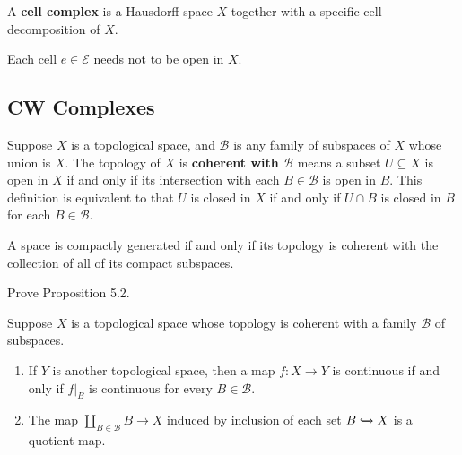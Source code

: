 A \textbf{cell complex} is a Hausdorff space \( X \) together with a specific cell decomposition of \( X \).

Each cell \( e \in \mathscr{E} \) needs not to be open in \( X \).

\subsection{CW Complexes}

Suppose \( X \) is a topological space, and \( \mathscr{B} \) is any family of subspaces of \( X \) whose union is \( X \). The topology of \( X \) is \textbf{coherent with \( \mathscr{B} \)} means a subset \( U \subseteq X \) is open in \( X \) if and only if its intersection with each \( B\in\mathscr{B} \) is open in \( B \). This definition is equivalent to that \( U \) is closed in \( X \) if and only if \( U\cap B \) is closed in \( B \) for each \( B \in \mathscr{B} \).

A space is compactly generated if and only if its topology is coherent with the collection of all of its compact subspaces.

\begin{exercise}{5.3}\label{exercise:5.3}
	Prove Proposition 5.2.

	Suppose \( X \) is a topological space whose topology is coherent with a family \( \mathscr{B} \) of subspaces.
	\begin{enumerate}[label={(\alph*)}]
		\item If \( Y \) is another topological space, then a map \( f: X\to Y \) is continuous if and only if \( f\vert_{B} \) is continuous for every \( B\in \mathscr{B} \).
		\item The map \( \coprod_{B\in\mathscr{B}}B \to X \) induced by inclusion of each set \( B\xhookrightarrow{} X \) is a quotient map.
	\end{enumerate}
\end{exercise}

